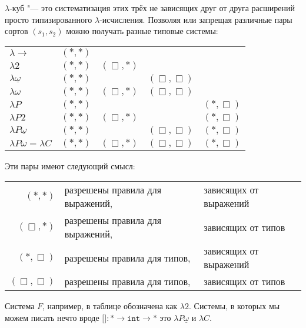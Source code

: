 $\lambda$-куб "--- это систематизация этих трёх не зависящих друг от друга расширений
просто типизированного $\lambda$-исчисления.
Позволяя или запрещая различные пары сортов $(s_1, s_2)$ можно получать разные типовые системы:
\begin{center}
\begin{tabular}{l c c c c} \toprule
    $\lambda{\rightarrow}$         & $(*, *)$ &             &                &             \\
    $\lambda 2$                    & $(*, *)$ & $(\Box, *)$ &                &             \\
    $\lambda \underline \omega$    & $(*, *)$ &             & $(\Box, \Box)$ &             \\
    $\lambda \omega$               & $(*, *)$ & $(\Box, *)$ & $(\Box, \Box)$ &             \\
    $\lambda P$                    & $(*, *)$ &             &                & $(*, \Box)$ \\
    $\lambda P2$                   & $(*, *)$ & $(\Box, *)$ &                & $(*, \Box)$ \\
    $\lambda P\underline \omega$   & $(*, *)$ &             & $(\Box, \Box)$ & $(*, \Box)$ \\
    $\lambda P \omega = \lambda C$ & $(*, *)$ & $(\Box, *)$ & $(\Box, \Box)$ & $(*, \Box)$ \\ \bottomrule
\end{tabular}
\end{center}%
Эти пары имеют следующий смысл:
\begin{center}
\begin{tabular}{r l@{\ }l} \toprule
    $(*, *)$       & разрешены правила для выражений, &зависящих от выражений \\
    $(\Box, *)$    & разрешены правила для выражений, &зависящих от типов     \\
    $(*, \Box)$    & разрешены правила для типов,     &зависящих от выражений \\
    $(\Box, \Box)$ & разрешены правила для типов,     &зависящих от типов     \\ \bottomrule
\end{tabular}
\end{center}

Система $F$, например, в таблице обозначена как $\lambda 2$.
Системы, в которых мы можем писать нечто вроде
$\texttt{[]}: * \rightarrow \mathtt{int} \rightarrow *$ это $\lambda P \underline \omega$ и $\lambda C$.

